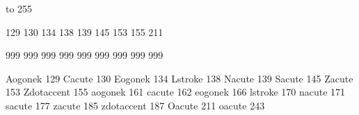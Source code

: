 

\startmapping[pl0]

 to 255

 129 %
 130 %
 134 %
 138 %
 139 %
 145 %
 153 %
 155 %
 211 %



\stopmapping

\startmapping[pl0]

 999  %
 999  %
 999  %
 999  %
 999  %
 999  %
 999  %
 999  %
 999  %

\stopmapping

\startencoding[pl0]

 Aogonek    129
 Cacute     130
 Eogonek    134
 Lstroke    138
 Nacute     139
 Sacute     145
 Zacute     153
 Zdotaccent 155
 aogonek    161
 cacute     162
 eogonek    166
 lstroke    170
 nacute     171
 sacute     177
 zacute     185
 zdotaccent 187
 Oacute     211
 oacute     243

